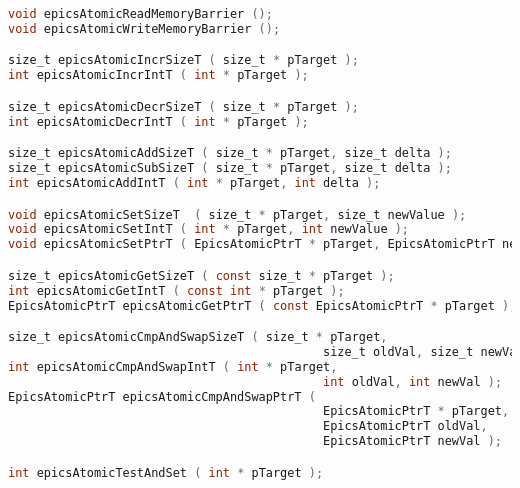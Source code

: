 \begin{lstlisting}[language=C]
void epicsAtomicReadMemoryBarrier ();
void epicsAtomicWriteMemoryBarrier ();

size_t epicsAtomicIncrSizeT ( size_t * pTarget );
int epicsAtomicIncrIntT ( int * pTarget );

size_t epicsAtomicDecrSizeT ( size_t * pTarget );
int epicsAtomicDecrIntT ( int * pTarget );

size_t epicsAtomicAddSizeT ( size_t * pTarget, size_t delta );
size_t epicsAtomicSubSizeT ( size_t * pTarget, size_t delta );
int epicsAtomicAddIntT ( int * pTarget, int delta );

void epicsAtomicSetSizeT  ( size_t * pTarget, size_t newValue ); 
void epicsAtomicSetIntT ( int * pTarget, int newValue );
void epicsAtomicSetPtrT ( EpicsAtomicPtrT * pTarget, EpicsAtomicPtrT newValue );

size_t epicsAtomicGetSizeT ( const size_t * pTarget );
int epicsAtomicGetIntT ( const int * pTarget );
EpicsAtomicPtrT epicsAtomicGetPtrT ( const EpicsAtomicPtrT * pTarget );

size_t epicsAtomicCmpAndSwapSizeT ( size_t * pTarget, 
                                            size_t oldVal, size_t newVal );
int epicsAtomicCmpAndSwapIntT ( int * pTarget, 
                                            int oldVal, int newVal );
EpicsAtomicPtrT epicsAtomicCmpAndSwapPtrT ( 
                                            EpicsAtomicPtrT * pTarget, 
                                            EpicsAtomicPtrT oldVal, 
                                            EpicsAtomicPtrT newVal );

int epicsAtomicTestAndSet ( int * pTarget );
\end{lstlisting}

